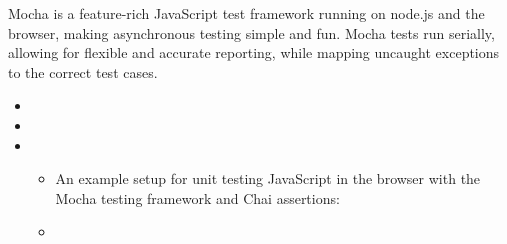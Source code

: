 
Mocha is a feature-rich JavaScript test framework running on node.js
and the browser, making asynchronous testing simple and fun. Mocha tests
run serially, allowing for flexible and accurate
reporting, while mapping uncaught exceptions to the correct test cases.

\begin{itemize}
\item
{}
\item
{}
\item
\begin{itemize}
\item
An example setup for unit testing JavaScript in the browser with the Mocha testing framework and Chai assertions:
\item
{}
\end{itemize}
\end{itemize}


